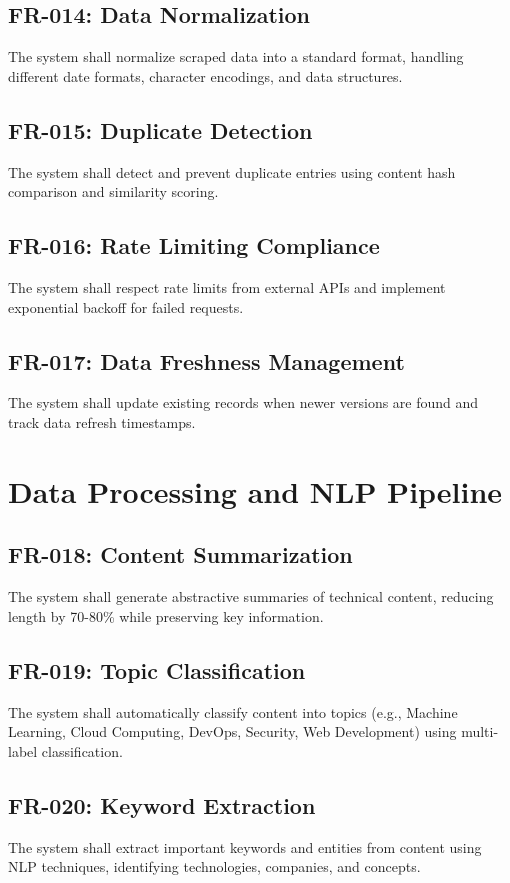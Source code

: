 \documentclass{report}
\begin{document}
\subsection{FR-014: Data Normalization}
The system shall normalize scraped data into a standard format, handling different date formats, character encodings, and data structures.

\subsection{FR-015: Duplicate Detection}
The system shall detect and prevent duplicate entries using content hash comparison and similarity scoring.

\subsection{FR-016: Rate Limiting Compliance}
The system shall respect rate limits from external APIs and implement exponential backoff for failed requests.

\subsection{FR-017: Data Freshness Management}
The system shall update existing records when newer versions are found and track data refresh timestamps.

\section{Data Processing and NLP Pipeline}

\subsection{FR-018: Content Summarization}
The system shall generate abstractive summaries of technical content, reducing length by 70-80\% while preserving key information.

\subsection{FR-019: Topic Classification}
The system shall automatically classify content into topics (e.g., Machine Learning, Cloud Computing, DevOps, Security, Web Development) using multi-label classification.

\subsection{FR-020: Keyword Extraction}
The system shall extract important keywords and entities from content using NLP techniques, identifying technologies, companies, and concepts.
\end{document}

